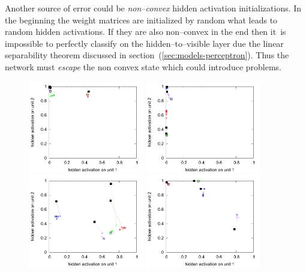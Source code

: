 Another source of error could be \emph{non--convex} hidden activation initializations. In the beginning the weight matrices are initialized by random what leads to random hidden activations. If they are also non--convex in the end then it~is impossible to perfectly classify on the hidden--to--visible layer due the linear separability theorem discussed in section~(\ref{sec:models-perceptron}). Thus the network must \emph{escape} the non convex state which could introduce problems. 



\begin{figure}[H]
  \centering
  \includegraphics[width=0.45\textwidth]{img/hid-bal-bad-init.pdf}  
  \includegraphics[width=0.45\textwidth]{img/hid-bal-bad-convex.pdf}  \\
  \includegraphics[width=0.45\textwidth]{img/hid-bal-bad-step.pdf}  
  \includegraphics[width=0.45\textwidth]{img/hid-bal-bad-stagnation.pdf}  \\

\end{figure}
